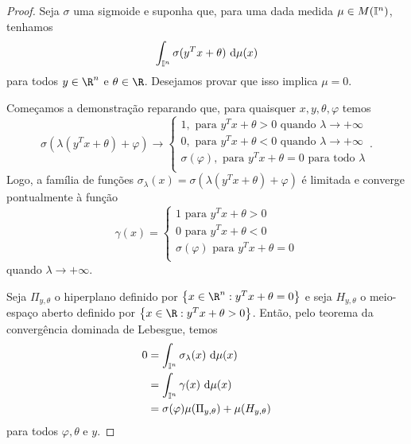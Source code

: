 \begin{proof}
    Seja \( \sigma \) uma sigmoide e suponha que, para uma dada medida \( \mu \in M(\mathbb{I}^{ n }) \), tenhamos \[
        \int_{ \I^{ n } } \sigma(y^{ T }x + \theta) \ \mathrm{d}\mu(x)
    \]
    para todos \( y \in \R^{ n } \) e \( \theta \in \R \).
    Desejamos provar que isso implica \( \mu = 0 \).

    Começamos a demonstração reparando que, para quaisquer \( x, y, \theta, \varphi \) temos \[
        \sigma(\lambda(y^{ T }x + \theta) + \varphi)
        \to
        \begin{cases}
            1, \text{ para } y^{ T }x + \theta > 0 \text{ quando } \lambda \to +\infty \\
            0, \text{ para } y^{ T }x + \theta < 0 \text{ quando } \lambda \to +\infty \\
            \sigma(\varphi), \text{ para } y^{ T }x + \theta = 0 \text{ para todo } \lambda \\
        \end{cases}
    .\]
    Logo, a família de funções \( \sigma_{ \lambda }(x) = \sigma(\lambda(y^{ T }x + \theta) + \varphi) \) é limitada e converge pontualmente à função \[
        \gamma(x) =
        \begin{cases}
            1 \text{ para } y^{ T }x + \theta > 0 \\
            0 \text{ para } y^{ T }x + \theta < 0 \\
            \sigma(\varphi) \text{ para } y^{ T }x + \theta = 0 \\
        \end{cases}
    \]
    quando \( \lambda \to +\infty \).

    Seja \( \Pi_{ y, \theta } \) o hiperplano definido por \( \left\{ x \in \R^{ n } : y^{ T }x + \theta = 0 \right\} \) e seja \( H_{ y, \theta } \) o meio-espaço aberto definido por \( \left\{ x \in \R : y^{ T }x + \theta > 0 \right\} \).
    Então, pelo teorema da convergência dominada de Lebesgue, temos %
    \begin{align*}
        0 &=
        \int_{ \mathbb{I}^{ n } } \sigma_{ \lambda }(x)  \ \mathrm{d}\mu(x) \\
        &= \int_{ \mathbb{I}^{ n } } \gamma(x) \ \mathrm{d}\mu(x) \\
        &= \sigma(\varphi)\mu(\Pi_{ y, \theta }) + \mu(H_{ y, \theta })
    \end{align*}
    para todos \( \varphi, \theta \) e \( y \).


\end{proof}
